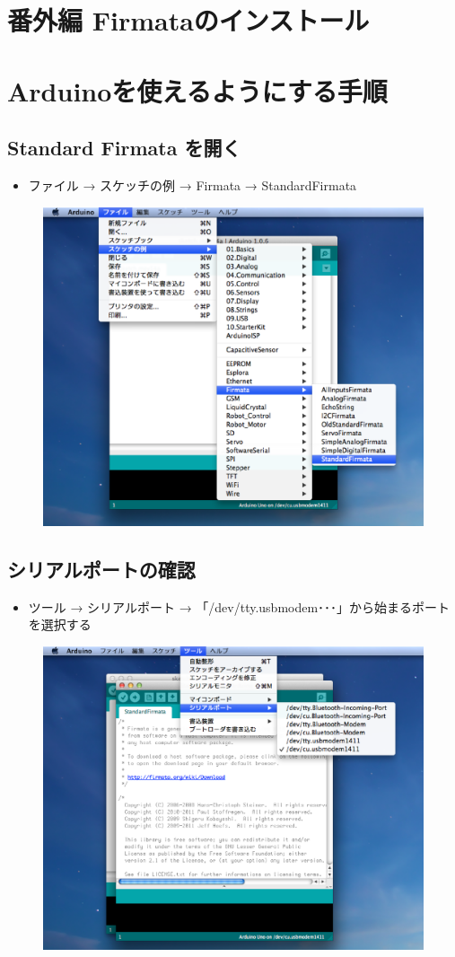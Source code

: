 \documentclass[11pt,a4paper]{jarticle}
\begin{document}
\section*{\LARGE{番外編 Firmataのインストール}}

\section{Arduinoを使えるようにする手順}
\subsection{Standard Firmata を開く}
\begin{itemize}
\item ファイル → スケッチの例 → Firmata → StandardFirmata
\end{itemize}

 \begin{figure}[h]
 \centering
 \includegraphics[width=0.63\columnwidth]{img/firmata3.eps}
\end{figure}

\subsection{シリアルポートの確認}
\begin{itemize}
\item ツール → シリアルポート → 「/dev/tty.usbmodem･･･」から始まるポートを選択する
\end{itemize}

 \begin{figure}[h]
 \centering
 \includegraphics[width=0.63\columnwidth]{img/firmata5.eps}
\end{figure}
\end{document}
